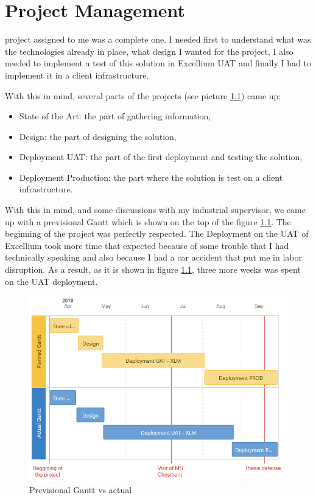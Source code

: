\documentclass{tnreport}
\begin{document}
\cleardoublepage


\chapter{Project Management}
 project assigned to me was a complete one. I needed first to understand what was the technologies already in place, what design I wanted for the project, I also needed to implement a test of this solution in \gls{Excellium} \gls{UAT} and finally I had to implement it in a client infrastructure.

With this in mind, several parts of the projects (see picture \ref{fig:Gantt}) came up: 
\begin{itemize}
    \item State of the Art: the part of gathering information,
    \item Design: the part of designing the solution,
    \item Deployment \gls{UAT}: the part of the first deployment and testing the solution,
    \item Deployment Production: the part where the solution is test on a client infrastructure.
\end{itemize}
With this in mind, and some discussions with my industrial supervisor, we came up with a previsional Gantt which is shown on the top of the figure \ref{fig:Gantt}. The beginning of the project was perfectly respected. The Deployment on the \gls{UAT} of \gls{Excellium} took more time that expected because of some trouble that I had technically speaking and also because I had a car accident that put me in labor disruption. As a result, as it is shown in figure \ref{fig:Gantt}, three more weeks was spent on the \gls{UAT} deployment.


\begin{figure}[h!]
  \begin{center}
  \includegraphics[width=\linewidth]{figures/Gantt2}
  \caption{Previsional Gantt vs actual}
  \label{fig:Gantt}
  \end{center}
\end{figure}
\end{document}
